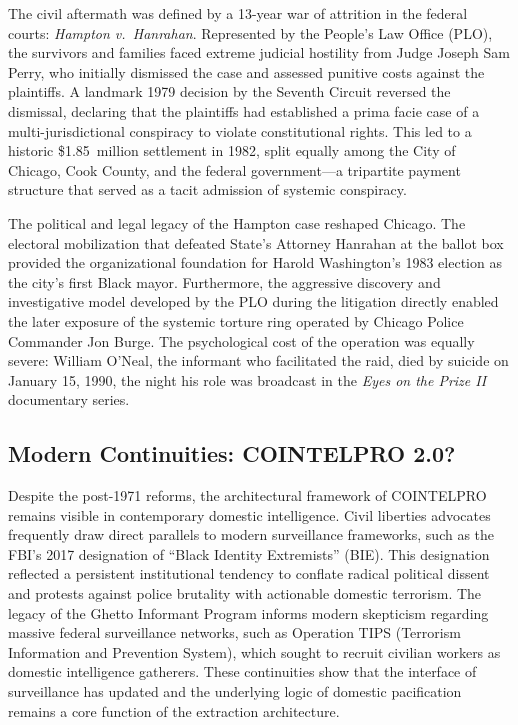 The civil aftermath was defined by a 13-year war of attrition in the federal courts: \textit{Hampton v.\ Hanrahan}. Represented by the People's Law Office (PLO), the survivors and families faced extreme judicial hostility from Judge Joseph Sam Perry, who initially dismissed the case and assessed punitive costs against the plaintiffs. A landmark 1979 decision by the Seventh Circuit reversed the dismissal, declaring that the plaintiffs had established a prima facie case of a multi-jurisdictional conspiracy to violate constitutional rights. This led to a historic \$1.85~million settlement in 1982, split equally among the City of Chicago, Cook County, and the federal government---a tripartite payment structure that served as a tacit admission of systemic conspiracy.

The political and legal legacy of the Hampton case reshaped Chicago. The electoral mobilization that defeated State's Attorney Hanrahan at the ballot box provided the organizational foundation for Harold Washington's 1983 election as the city's first Black mayor. Furthermore, the aggressive discovery and investigative model developed by the PLO during the litigation directly enabled the later exposure of the systemic torture ring operated by Chicago Police Commander Jon Burge. The psychological cost of the operation was equally severe: William O'Neal, the informant who facilitated the raid, died by suicide on January 15, 1990, the night his role was broadcast in the \textit{Eyes on the Prize II} documentary series.

\subsection{Modern Continuities: COINTELPRO 2.0?}

Despite the post-1971 reforms, the architectural framework of COINTELPRO remains visible in contemporary domestic intelligence. Civil liberties advocates frequently draw direct parallels to modern surveillance frameworks, such as the FBI's 2017 designation of ``Black Identity Extremists'' (BIE). This designation reflected a persistent institutional tendency to conflate radical political dissent and protests against police brutality with actionable domestic terrorism. The legacy of the Ghetto Informant Program informs modern skepticism regarding massive federal surveillance networks, such as Operation TIPS (Terrorism Information and Prevention System), which sought to recruit civilian workers as domestic intelligence gatherers. These continuities show that the interface of surveillance has updated and the underlying logic of domestic pacification remains a core function of the extraction architecture.

